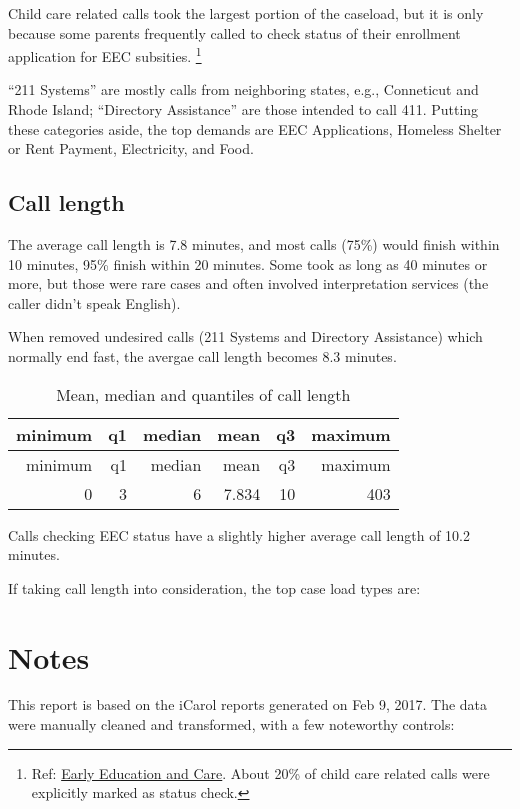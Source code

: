 \documentclass[]{tufte-handout}
\begin{document}
Child care related calls took the largest portion of the caseload, but
it is only because some parents frequently called to check status of
their enrollment application for EEC subsities. \footnote{Ref:
  \href{http://www.mass.gov/edu/birth-grade-12/early-education-and-care/}{Early
  Education and Care}. About 20\% of child care related calls were
  explicitly marked as status check.}

``211 Systems'' are mostly calls from neighboring states, e.g.,
Conneticut and Rhode Island; ``Directory Assistance'' are those intended
to call 411. Putting these categories aside, the top demands are EEC
Applications, Homeless Shelter or Rent Payment, Electricity, and Food.

\subsection{Call length}\label{call-length}

The average call length is 7.8 minutes, and most calls (75\%) would
finish within 10 minutes, 95\% finish within 20 minutes. Some took as
long as 40 minutes or more, but those were rare cases and often involved
interpretation services (the caller didn't speak English).

When removed undesired calls (211 Systems and Directory Assistance)
which normally end fast, the avergae call length becomes 8.3 minutes.

\begin{longtable}[]{@{}rrrrrr@{}}
\caption{Mean, median and quantiles of call length}\tabularnewline
\toprule
minimum & q1 & median & mean & q3 & maximum\tabularnewline
\midrule
\endfirsthead
\toprule
minimum & q1 & median & mean & q3 & maximum\tabularnewline
\midrule
\endhead
0 & 3 & 6 & 7.834 & 10 & 403\tabularnewline
\bottomrule
\end{longtable}

Calls checking EEC status have a slightly higher average call length of
10.2 minutes.

If taking call length into consideration, the top case load types are:

\section{Notes}\label{notes}

This report is based on the iCarol reports generated on Feb 9, 2017. The
data were manually cleaned and transformed, with a few noteworthy
controls:
\end{document}
